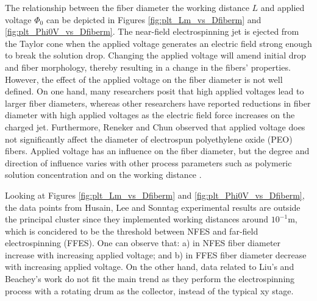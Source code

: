 The relationship between the fiber diameter the working distance $L$ and applied voltage $\Phi_0$ can be depicted in Figures \ref{fig:plt_Lm_vs_Dfiberm} and \ref{fig:plt_Phi0V_vs_Dfiberm}. The near-field electrospinning jet is ejected from the Taylor cone when the applied voltage generates an electric field strong enough to break the solution drop. Changing the applied voltage will amend initial drop and fiber morphology, thereby resulting in a change in the fibers' properties. However, the effect of the applied voltage on the fiber diameter is not well defined. On one hand, many researchers posit that high applied voltages lead to larger fiber diameters, whereas other researchers have reported reductions in fiber diameter with high applied voltages as the electric field force increases on the charged jet. \cite{Zhang2005} Furthermore, Reneker and Chun observed that applied voltage does not significantly affect the diameter of electrospun polyethylene oxide (PEO) fibers. \cite{Reneker1996} Applied voltage has an influence on the fiber diameter, but the degree and direction of influence varies with other process parameters such as polymeric solution concentration and on the working distance \cite{Yordem2008, Chang2016}.

Looking at Figures \ref{fig:plt_Lm_vs_Dfiberm} and \ref{fig:plt_Phi0V_vs_Dfiberm}, the data points from Husain, Lee and Sonntag \cite{Husain2016, Lee2012, Sonntag2020} experimental results are outside the principal cluster since they implemented working distances around $10^{-1} \textrm{m}$, which is concidered to be the threshold between NFES and far-field electrospinning (FFES). One can observe that: a) in NFES fiber diameter increase with increasing applied voltage; and b) in FFES fiber diameter decrease with increasing applied voltage. On the other hand, data related to Liu's and Beachey's work \cite{Liu2014, Beachey2011} do not fit the main trend as they perform the electrospinning process with a rotating drum as the collector, instead of the typical xy stage.

